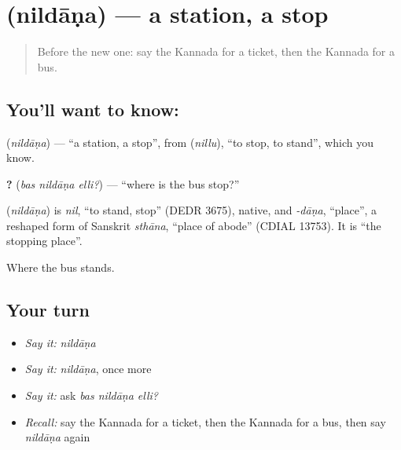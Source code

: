 \section[\texorpdfstring{\kn{ನಿಲ್ದಾಣ} (nildāṇa)}{ನಿಲ್ದಾಣ (nildāṇa)}]{ (nildāṇa) — a station, a stop}

\label{lesson:KA-C100-station}



\begin{quote}
Before the new one: say the Kannada for a ticket, then the Kannada for a bus.
\end{quote}

\subsection*{You'll want to know: }
\textbf{} (\emph{nildāṇa}) — \textquotedblleft{}a station, a stop\textquotedblright{}, from \textbf{} (\emph{nillu}), \textquotedblleft{}to stop, to stand\textquotedblright{}, which you know.

\textbf{  ?} (\emph{bas nildāṇa elli?}) — \textquotedblleft{}where is the bus stop?\textquotedblright{}

\begin{cousinweb}
\textbf{} (\emph{nildāṇa}) is \emph{nil}, \textquotedblleft{}to stand, stop\textquotedblright{} (DEDR 3675), native, and \emph{-dāṇa}, \textquotedblleft{}place\textquotedblright{}, a reshaped form of Sanskrit \emph{sthāna}, \textquotedblleft{}place of abode\textquotedblright{} (CDIAL 13753). It is \textquotedblleft{}the stopping place\textquotedblright{}.
\end{cousinweb}

\begin{grammarlens}[title={What you've built}]
Where the bus stands.
\end{grammarlens}

\subsection*{Your turn}
\begin{itemize}
\raggedright
  \item \emph{Say it:} \emph{nildāṇa}
  \item \emph{Say it:} \emph{nildāṇa}, once more
  \item \emph{Say it:} ask \emph{bas nildāṇa elli?}
  \item \emph{Recall:} say the Kannada for a ticket, then the Kannada for a bus, then say \emph{nildāṇa} again
\end{itemize}

